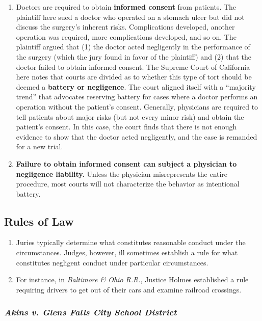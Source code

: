 \begin{enumerate}
    \item Doctors are required to obtain \textbf{informed consent} from patients. The plaintiff here sued a doctor who operated on a stomach ulcer but did not discuss the surgery's inherent risks. Complications developed, another operation was required, more complications developed, and so on. The plaintiff argued that (1) the doctor acted negligently in the performance of the surgery (which the jury found in favor of the plaintiff) and (2) that the doctor failed to obtain informed consent. The Supreme Court of California here notes that courts are divided as to whether this type of tort should be deemed a \textbf{battery or negligence}. The court aligned itself with a ``majority trend'' that advocates reserving battery for cases where a doctor performs an operation without the patient's consent. Generally, physicians are required to tell patients about major risks (but not every minor risk) and obtain the patient's consent. In this case, the court finds that there is not enough evidence to show that the doctor acted negligently, and the case is remanded for a new trial.
    \item \textbf{Failure to obtain informed consent can subject a physician to negligence liability.} Unless the physician misrepresents the entire procedure, most courts will not characterize the behavior as intentional battery.
\end{enumerate}

\subsection{Rules of Law}

\begin{enumerate}
    \item Juries typically determine what constitutes reasonable conduct under the circumstances. Judges, however, ill sometimes establish a rule for what constitutes negligent conduct under particular circumstances.
    \item For instance, in \emph{Baltimore \& Ohio R.R.}, Justice Holmes established a rule requiring drivers to get out of their cars and examine railroad crossings.
\end{enumerate}

\subsubsection{\emph{Akins v. Glens Falls City School District}}

